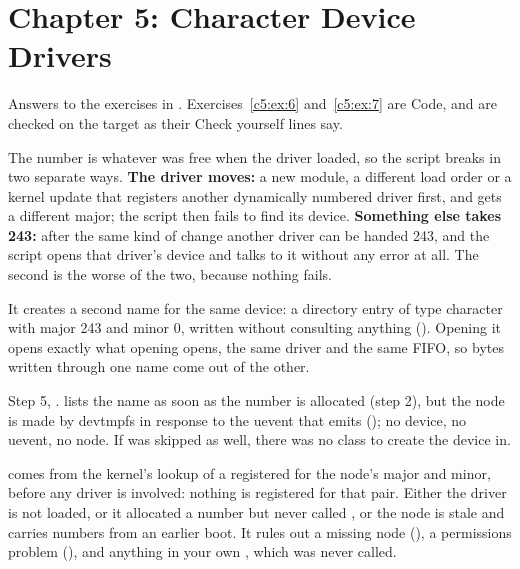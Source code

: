 
\section{Chapter 5: Character Device Drivers}
\label{sol:sec:c5}
Answers to the exercises in . Exercises~\ref{c5:ex:6} and~\ref{c5:ex:7}
are Code, and are checked on the target as their Check yourself lines say.


 The number is whatever was free when the driver loaded, so the script breaks in two
separate ways. \textbf{The driver moves:} a new module, a different load order or a kernel update
that registers another dynamically numbered driver first, and  gets a different
major; the script then fails to find its device. \textbf{Something else takes 243:} after the same
kind of change another driver can be handed 243, and the script opens that driver's device and
talks to it without any error at all. The second is the worse of the two, because nothing fails.

 It creates a second name for the same device: a directory entry of type character with
major 243 and minor 0, written without consulting anything (). Opening it opens
exactly what opening  opens, the same driver and the same FIFO, so bytes written
through one name come out of the other.

 Step 5, .  lists the name as soon as the number
is allocated (step 2), but the node is made by devtmpfs in response to the uevent that
 emits (); no device, no uevent, no node. If
 was skipped as well, there was no class to create the device in.

  comes from the kernel's lookup of a registered  for the node's
major and minor, before any driver is involved: nothing is registered for that pair. Either the
driver is not loaded, or it allocated a number but never called , or the node is
stale and carries numbers from an earlier boot. It rules out a missing node (), a
permissions problem (), and anything in your own , which was never called.

